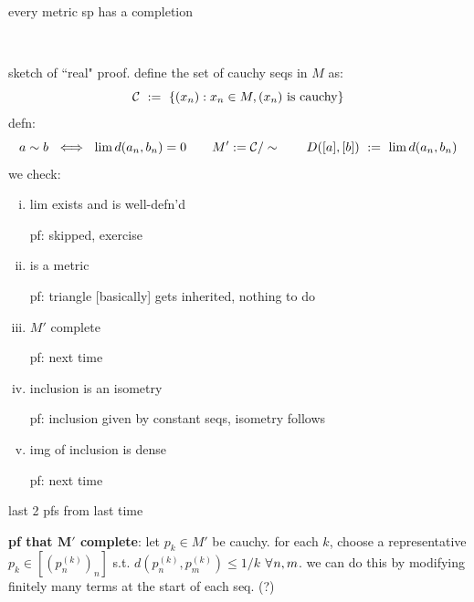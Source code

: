 \begin{thm}
    every metric sp has a completion
\end{thm} \

\begin{pf}[source=Primary Source Material]
    sketch of ``real" proof.
	define the set of cauchy seqs in $M$ as:
	\begin{equation*}
	    \mathcal{C} \ := \ \left\{{(x_{n}):x_{n}\in M, (x_{n}) \textrm{ is cauchy}}\right\}
	\end{equation*}
	defn:
	\begin{equation*}
		a\sim b \ \iff \ \lim d(a_{n},b_{n})=0 \qquad
		M':=\mathcal{C}/\sim \qquad
		D([a],[b]) \ := \ \lim d(a_{n},b_{n})
	\end{equation*}
	we check:
	\begin{enumerate}[i)]
		\item lim exists and is well-defn'd

			pf: skipped, exercise
		\item is a metric

			pf: triangle [basically] gets inherited, nothing to do
		\item $M'$ complete

			pf: next time
		\item inclusion is an isometry

			pf: inclusion given by constant seqs, isometry follows
		\item img of inclusion is dense

			pf: next time
	\end{enumerate}
\end{pf}

last 2 pfs from last time

\textbf{pf that $\bm{M'}$ complete}:
let $p_{k}\in M'$ be cauchy.
for each $k$, choose a representative $p_{k}\in[(p_{n}^{(k)})_{n}]$
s.t. $d(p_{n}^{(k)},p_{m}^{(k)})\leq1/k$ $\fa n,m$.
we can do this by modifying finitely many terms at the start of each seq. (?)

